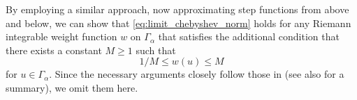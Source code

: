 \documentclass[12pt,oneside,reqno]{amsart}
\newtheorem{proposition}[theorem]{Proposition}
\theoremstyle{definition}
\numberwithin{equation}{section}
\newcommand{\R}{{\mathbb R}}
\newcommand{\E}{{\mathsf E}}
\renewcommand{\Im}{\operatorname{Im}}
\renewcommand{\Cap}{\operatorname{Cap}}
\begin{document}
By employing a similar approach, now approximating step functions from above and below, we can show that \eqref{eq:limit_chebyshev_norm} holds for any Riemann integrable weight function $w$ on $\Gamma_\alpha$ that satisfies the additional condition that there exists a constant $M\geq 1$ such that
\begin{equation}
	1/M\leq w(u)\leq M
	\label{eq:weight_bounds}
\end{equation}
for $u\in \Gamma_\alpha$.
Since the necessary arguments closely follow those in \cite[Chapter I.7]{bernstein30} (see also \cite[Appendix A.2]{christiansen-eichinger-rubin23} for a summary), we omit them here.

%	
\end{document}
